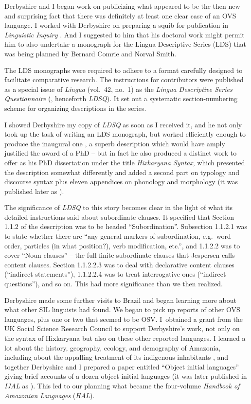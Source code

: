 \documentclass[output=paper,colorlinks,citecolor=brown
]{langscibook}
\begin{document}
Derbyshire and I began work on publicizing what appeared to be the then
new and surprising fact that there was definitely at least one clear
case of an OVS language. I worked with Derbyshire on preparing a squib
for publication in \textit{Linguistic Inquiry} \citep{Derbyshire77}.
And I suggested to him that his doctoral work might permit him to
also undertake a monograph for the Lingua Descriptive Series (LDS)
that was being planned by Bernard Comrie and Norval Smith.

The LDS monographs were required to adhere to a format carefully designed
to facilitate comparative research. The instructions for contributors
were published as a special issue of \textit{Lingua} (vol.~42, no.~1)
as the \textit{Lingua Descriptive Series Questionnaire}
(\citealt{ComrSmit77}, henceforth \textit{LDSQ}). It set out a systematic
section-numbering scheme for organizing descriptions in the series.

I showed Derbyshire my copy of \textit{LDSQ} as soon as I received it, and
he not only took up the task of writing an LDS monograph, but worked
efficiently enough to produce the inaugural one \citep{Derbyshire79},
a superb description which would have amply justified the award of a
PhD -- but in fact he also produced a distinct work to offer as his
PhD dissertation under the title \textit{Hixkaryana Syntax}, which
presented the description somewhat differently and added a second
part on typology and discourse syntax plus eleven appendices on
phonology and morphology (it was published later as
\citealt{Derbyshire85}).

The significance of \textit{LDSQ} to this story becomes clear in
the light of what its detailed instructions said about subordinate
clauses. It specified that Section 1.1.2 of the description was to
be headed ``Subordination''. Subsection 1.1.2.1 was to state whether
there are ``any general markers of subordination, e.g.\ word order,
particles (in what position?), verb modification, etc.'', and 1.1.2.2
was to cover ``Noun clauses'' -- the full finite subordinate clauses
that Jespersen calls content clauses. Section 1.1.2.2.3 was to deal
with declarative content clauses (``indirect statements''), 1.1.2.2.4
was to treat interrogative ones (``indirect questions''), and so on.
This had more significance than we then realized.

Derbyshire made some further visits to Brazil and began learning more about
what other SIL linguists had found. We began to pick up reports of
other OVS languages, plus one or two that seemed to be OSV. I~obtained
a grant from the UK Social Science Research Council to support Derbyshire's
work, not only on the syntax of Hixkaryana but also on these other
reported languages. I learned a lot about the history, geography,
ecology, and demography of Amazonia, including about the appalling
treatment of its indigenous inhabitants \citep{Pullum78}, and together
Derbyshire and I prepared a paper entitled ``Object initial languages'' giving
brief accounts of a dozen object-initial languages (it was later
published in \textit{IJAL} as \citealt{DerbPull81}). This led to our
planning what became the four-volume \textit{Handbook of Amazonian
Languages} (\textit{HAL}).
\end{document}
